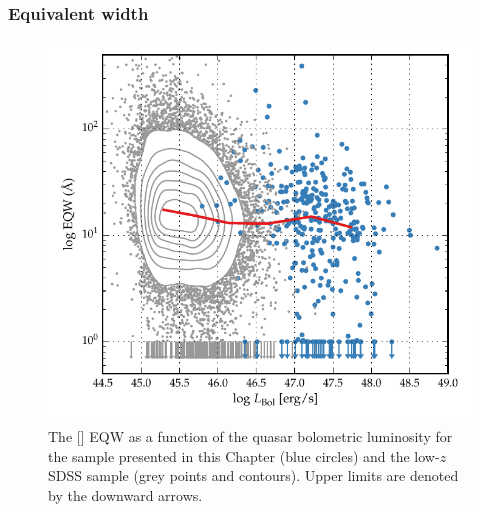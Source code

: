 \subsubsection{Equivalent width}

\begin{figure}[t!]
    \includegraphics[width=\columnwidth]{figures/chapter04/eqw_lum.pdf} 
    \caption[{The [] EQW as a function of the quasar bolometric luminosity for the sample presented in this Chapter (blue circles) and the low-$z$ SDSS sample (grey points and contours).}]{The [] EQW as a function of the quasar bolometric luminosity for the sample presented in this Chapter (blue circles) and the low-$z$ SDSS sample (grey points and contours). Upper limits are denoted by the downward arrows. }     
    \label{fig:eqw_lum}
\end{figure}

